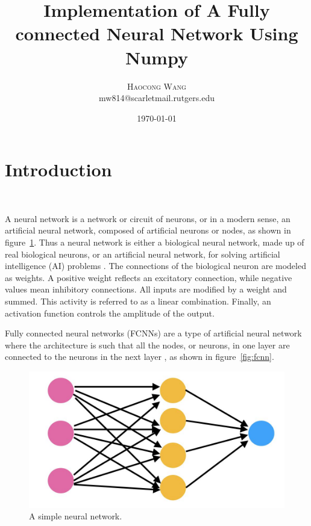 \documentclass[twoside,twocolumn]{article}
\title{Implementation of A Fully connected Neural Network Using Numpy} %
\author{%
\textsc{Haocong Wang} \\[1ex] %
\normalsize {mw814@scarletmail.rutgers.edu} %
}
\date{\today} %
\begin{document}
\maketitle


\section{Introduction}~\label{sec:intro}

A neural network is a network or circuit of neurons, or in a modern sense, an artificial neural network, composed of artificial neurons or nodes, as shown in figure~\ref{fig:nn}. Thus a neural network is either a biological neural network, made up of real biological neurons, or an artificial neural network, for solving artificial intelligence (AI) problems \cite{nn}. The connections of the biological neuron are modeled as weights. A positive weight reflects an excitatory connection, while negative values mean inhibitory connections. All inputs are modified by a weight and summed. This activity is referred to as a linear combination. Finally, an activation function controls the amplitude of the output.

Fully connected neural networks (FCNNs) are a type of artificial neural network where the architecture is such that all the nodes, or neurons, in one layer are connected to the neurons in the next layer \cite{fcnn}, as shown in figure~\ref{fig:fcnn}. 

\begin{figure}
	\centering
	\includegraphics[width=1.0\columnwidth, clip=true]{fig/nn.jpg}
	\vspace{-4mm}
	\caption{A simple neural network.}
	\label{fig:nn}
	\vspace{-5mm}
\end{figure}
\end{document}
